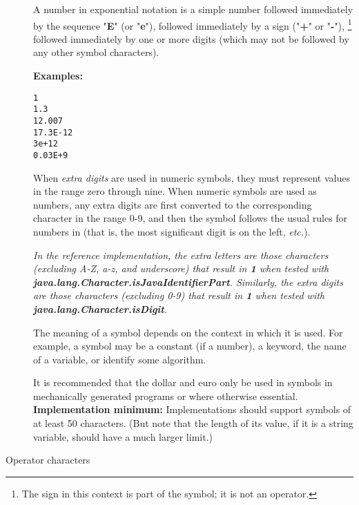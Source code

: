 \begin{description}
A number in exponential notation is a simple number followed immediately
by the sequence "\textbf{E}" (or "\textbf{e}"), followed
immediately by a sign ("\textbf{+}" or "\textbf{-}"),
\footnote{
The sign in this context is part of the symbol; it is not an
operator.
}
followed immediately by one or more digits (which may not be followed by
any other symbol characters).
 
\textbf{Examples:}
\begin{alltt}
1
1.3
12.007
17.3E-12
3e+12
0.03E+9
\end{alltt}
 
When \emph{extra digits} are used in numeric symbols, they must
represent values in the range zero through nine.
When numeric symbols are used as numbers, any extra digits are first
converted to the corresponding character in the range 0-9, and then the
symbol follows the usual rules for numbers in \nr{} (that is, the most
significant digit is on the left, \emph{etc.}).
 
\emph{In the reference implementation, the extra letters are those
characters (excluding A-Z, a-z, and underscore) that result
in \textbf{1} when tested with
\\\textbf{java.lang.Character.isJavaIdentifierPart}.
Similarly, the extra digits are those characters (excluding 0-9) that
result in \textbf{1} when tested with \textbf{java.lang.Character.isDigit}.
}
 
The meaning of a symbol depends on the context in which it is used.
For example, a symbol may be a constant (if a number), a keyword, the
name of a variable, or identify some algorithm.
 
It is recommended that the dollar and euro only be used in symbols in
mechanically generated programs or where otherwise essential.
 \textbf{Implementation minimum:} Implementations should support
symbols of at least 50 characters.
(But note that the length of its value, if it is a string variable,
should have a much larger limit.)
\item[Operator characters]\label{refopers}


\end{description}
